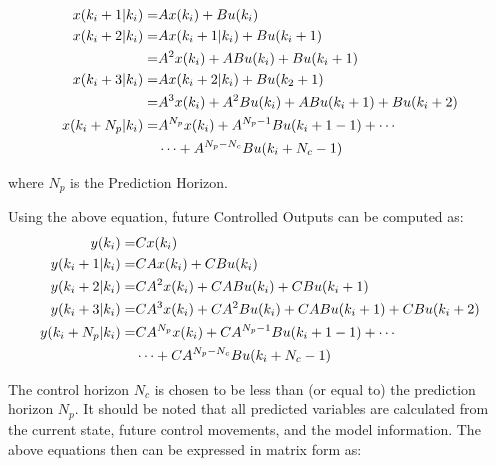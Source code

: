             \begin{equation}
                \label{eq:mpc2}
                \aligned
                    x(k_i+1|k_i)  =& Ax(k_i) + B u(k_i)\\
                    x(k_i+2|k_i)  =& Ax(k_i+1|k_i) + B u(k_i+1)\\
                                  =& A^{2}x(k_i) + AB u(k_i) + B u(k_i+1)\\
                    x(k_i+3|k_i)  =& Ax(k_i+2|k_i) + B u(k_2+1)\\
                                  =& A^{3}x(k_i) + A^2B u(k_i)+ AB u(k_i+1) + B u(k_i+2)\\
                    x(k_i+N_p|k_i)=& A^{N_p} x(k_i) + A^{N_{p}-1} B u(k_i+1-1) + \cdots\\
                                   & \cdots + A^{N_{p}-N_{c}} B u(k_i+N_c-1)
                \endaligned
            \end{equation}                

            where $N_p$ is the Prediction Horizon. 
            
            Using the above equation, future Controlled Outputs can be computed as:
            \begin{equation}
                \aligned
                    y(k_i)        =& Cx(k_i)\\
                    y(k_i+1|k_i)  =& CAx(k_i) + CB u(k_i)\\
                    y(k_i+2|k_i)  =& CA^{2}x(k_i) + CAB u(k_i) + CB  u(k_i+1)\\
                    y(k_i+3|k_i)  =& CA^{3}x(k_i) + CA^2B u(k_i)+ CAB u(k_i+1) + CB u(k_i+2)\\
                    y(k_i+N_p|k_i)=& CA^{N_p} x(k_i) + CA^{N_{p}-1} B u(k_i+1-1) + \cdots\\
                                   & \cdots + CA^{N_{p}-N_{c}} B u(k_i+N_c-1)
                \endaligned
                \label{eq:outputs1}
            \end{equation}   
            
            The control horizon $N_c$ is chosen to be less than (or equal to) the prediction horizon $N_p$.
            It should be noted that all predicted variables are calculated from the current state, future control movements, and the model information.
            The above equations then can be expressed in matrix form as:
            
